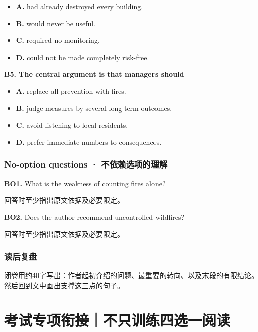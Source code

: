 \documentclass[
  11pt,
]{ctexart}
\begin{document}
\begin{itemize}
\item
  \textbf{A.} had already destroyed every building.
\item
  \textbf{B.} would never be useful.
\item
  \textbf{C.} required no monitoring.
\item
  \textbf{D.} could not be made completely risk-free.
\end{itemize}

\textbf{B5. The central argument is that managers should}

\begin{itemize}
\item
  \textbf{A.} replace all prevention with fires.
\item
  \textbf{B.} judge measures by several long-term outcomes.
\item
  \textbf{C.} avoid listening to local residents.
\item
  \textbf{D.} prefer immediate numbers to consequences.
\end{itemize}

\subsubsection{No-option questions ·
不依赖选项的理解}\label{no-option-questions-ux4e0dux4f9dux8d56ux9009ux9879ux7684ux7406ux89e3-1}

\textbf{BO1.} What is the weakness of counting fires alone?

回答时至少指出原文依据及必要限定。

\textbf{BO2.} Does the author recommend uncontrolled wildfires?

回答时至少指出原文依据及必要限定。

\subsubsection{读后复盘}\label{ux8bfbux540eux590dux76d8-1}

闭卷用约40字写出：作者起初介绍的问题、最重要的转向、以及末段的有限结论。然后回到文中画出支撑这三点的句子。

\section{考试专项衔接｜不只训练四选一阅读}\label{ux8003ux8bd5ux4e13ux9879ux8854ux63a5ux4e0dux53eaux8badux7ec3ux56dbux9009ux4e00ux9605ux8bfb}
\end{document}
